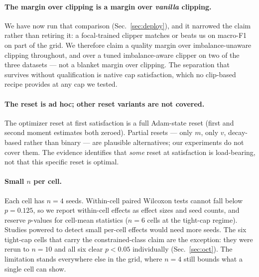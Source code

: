 \documentclass[10pt]{article}
\begin{document}
{
\paragraph{The margin over clipping is a margin over \emph{vanilla} clipping.}
We have now run that comparison (Sec.~\ref{sec:deploy}), and it narrowed the claim
rather than retiring it: a focal-trained clipper matches or beats us on macro-F1 on
part of the grid. We therefore claim a quality margin over imbalance-unaware
clipping throughout, and over a tuned imbalance-aware clipper on two of the three
datasets --- not a blanket margin over clipping. The separation that survives
without qualification is native cap satisfaction, which no clip-based recipe
provides at any cap we tested.}

\paragraph{The reset is ad hoc; other reset variants are not covered.}
The optimizer reset at first satisfaction is a full Adam-state reset
(first and second moment estimates both zeroed). Partial resets --- only
$m$, only $v$, decay-based rather than binary --- are plausible
alternatives; our experiments do not cover them. The evidence identifies
that \emph{some} reset at satisfaction is load-bearing, not that this
specific reset is optimal.

\paragraph{Small $n$ per cell.}
Each cell has $n{=}4$ seeds. Within-cell paired Wilcoxon tests cannot
fall below $p{=}0.125$, so we report within-cell effects as effect sizes
and seed counts, and reserve $p$-values for cell-mean statistics ($n{=}6$
cells at the tight-cap regime). Studies powered to detect small
per-cell effects would need more seeds.{ The six tight-cap cells
that carry the constrained-class claim are the exception: they were rerun to
$n{=}10$ and all six clear $p<0.05$ individually
(Sec.~\ref{sec:oct}). The limitation stands everywhere else in the grid, where
$n{=}4$ still bounds what a single cell can show.}
\end{document}
